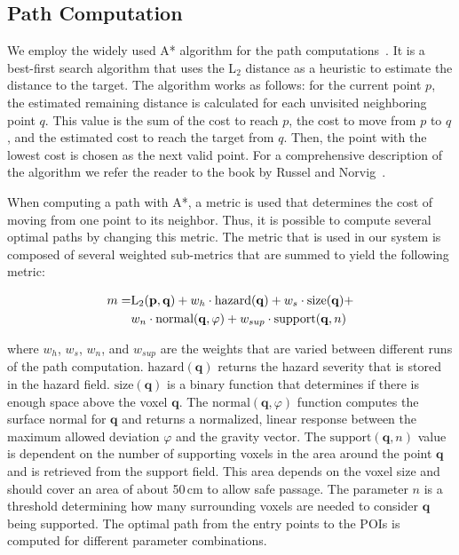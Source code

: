 \documentclass[conference,10pt,letter]{IEEEtran}
\begin{document}
\subsection{Path Computation} \label{sec:overview:pathcomputation}
We employ the widely used A* algorithm for the path computations~\cite{4082128}. It is a best-first search algorithm that uses the L$_2$ distance as a heuristic to estimate the distance to the target. The algorithm works as follows: for the current point $p$, the estimated remaining distance is calculated for each unvisited neighboring point $q$. This value is the sum of the cost to reach $p$, the cost to move from $p$ to $q$, and the estimated cost to reach the target from $q$. Then, the point with the lowest cost is chosen as the next valid point. For a comprehensive description of the algorithm we refer the reader to the book by Russel and Norvig~\cite{AStar}.

When computing a path with A*, a metric is used that determines the cost of moving from one point to its neighbor. Thus, it is possible to compute several optimal paths by changing this metric. The metric that is used in our system is composed of several weighted sub-metrics that are summed to yield the following metric:

\begin{equation}
\begin{array}{r@{}l}
m = & \textrm{L}_2(\mathbf{p},\mathbf{q}) + w_h \cdot \textrm{hazard}(\mathbf{q}) + w_s \cdot \textrm{size}(\mathbf{q}) + \vspace*{0.1cm} \\
  & w_n \cdot \textrm{normal}(\mathbf{q},\varphi) + w_{sup} \cdot \textrm{support}(\mathbf{q},n)
\end{array}
\end{equation}

\noindent where $w_h$, $w_s$, $w_n$, and $w_{sup}$ are the weights that are varied between different runs of the path computation. $\textrm{hazard}(\mathbf{q})$ returns the hazard severity that is stored in the hazard field. $\textrm{size}(\mathbf{q})$ is a binary function that determines if there is enough space above the voxel $\mathbf{q}$. The $\textrm{normal}(\mathbf{q},\varphi)$ function computes the surface normal for $\mathbf{q}$ and returns a normalized, linear response between the maximum allowed deviation $\varphi$ and the gravity vector. The $\mathrm{support}(\mathbf{q},n)$ value is dependent on the number of supporting voxels in the area around the point $\mathbf{q}$ and is retrieved from the support field. This area depends on the voxel size and should cover an area of about 50\,cm to allow safe passage. The parameter $n$ is a threshold determining how many surrounding voxels are needed to consider $\mathbf{q}$ being supported. The optimal path from the entry points to the POIs is computed for different parameter combinations.
\end{document}
